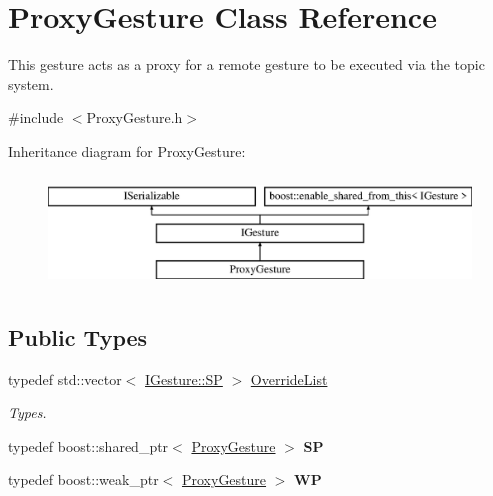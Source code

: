 \hypertarget{class_proxy_gesture}{}\section{Proxy\+Gesture Class Reference}
\label{class_proxy_gesture}


This gesture acts as a proxy for a remote gesture to be executed via the topic system.  




{\ttfamily \#include $<$Proxy\+Gesture.\+h$>$}

Inheritance diagram for Proxy\+Gesture\+:\begin{figure}[H]
\begin{center}
\leavevmode
\includegraphics[height=3.000000cm]{class_proxy_gesture}
\end{center}
\end{figure}
\subsection*{Public Types}
\begin{DoxyCompactItemize}
\item 
\mbox{\label{class_proxy_gesture_a5853df6f3567a9be2b0970422557e953}} 
typedef std\+::vector$<$ \hyperlink{class_i_gesture_a4455e468c21c82736bb3ec97c1c72158}{I\+Gesture\+::\+SP} $>$ \hyperlink{class_proxy_gesture_a5853df6f3567a9be2b0970422557e953}{Override\+List}
\begin{DoxyCompactList}\small\item\em Types. \end{DoxyCompactList}\item 
\mbox{\label{class_proxy_gesture_a76d456c0053c383b8b6fd70e3c5dd859}} 
typedef boost\+::shared\+\_\+ptr$<$ \hyperlink{class_proxy_gesture}{Proxy\+Gesture} $>$ {\bfseries SP}
\item 
\mbox{\label{class_proxy_gesture_aade8789f5d62ca217f278d4471ffd1e9}} 
typedef boost\+::weak\+\_\+ptr$<$ \hyperlink{class_proxy_gesture}{Proxy\+Gesture} $>$ {\bfseries WP}
\end{DoxyCompactItemize}
